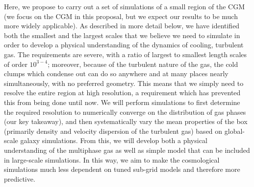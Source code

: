\documentclass[11pt,letterpaper,english]{article}
\begin{document}
Here, we propose to carry out a set of simulations of a small region of the CGM (we focus on the CGM in this proposal, but we expect our results to be much more widely applicable).  As described in more detail below, we have identified both the smallest and the largest scales that we believe we need to simulate in order to develop a physical understanding of the dynamics of cooling, turbulent gas.  The requirements are severe, with a ratio of largest to smallest length scales of order $10^{3-4}$; moreover, because of the turbulent nature of the gas, the cold clumps which condense out can do so anywhere and at many places nearly simultaneously, with no preferred geometry.  This means that we simply need to resolve the entire region at high resolution, a requirement which has prevented this from being done until now.  We will perform simulations to first determine the required resolution to numerically converge on the distribution of gas phases (our key takeaway), and then systematically vary the mean properties of the box (primarily density and velocity dispersion of the turbulent gas) based on global-scale galaxy simulations.  From this, we will develop both a physical understanding of the multiphase gas as well as simple model that can be included in large-scale simulations.  In this way, we aim to make the cosmological simulations much less dependent on tuned sub-grid models and therefore more predictive.








\end{document}
